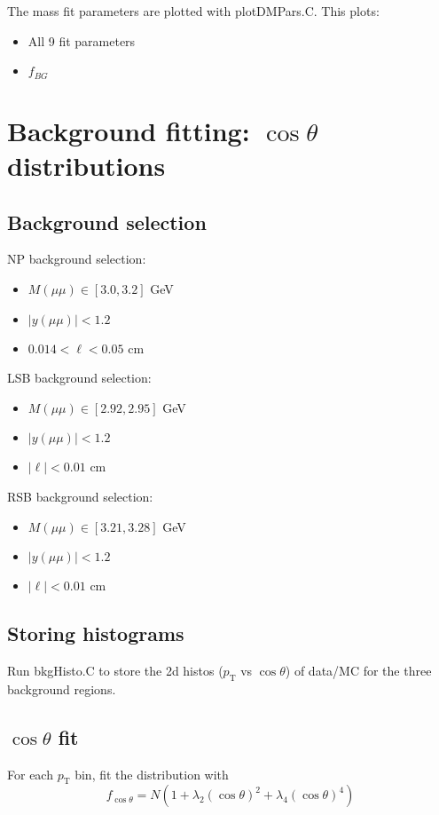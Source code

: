\documentclass{article}
\newcommand{\pt}{p_\text{T}}
\newcommand{\cost}{\cos\theta}
\begin{document}
The mass fit parameters are plotted with plotDMPars.C. This plots:
\begin{itemize}
\item All 9 fit parameters
\item $f_{BG}$
\end{itemize}

\pagebreak

\section{Background fitting: $\cost$ distributions}
\subsection{Background selection}

NP background selection:
\begin{itemize}
\item $M(\mu\mu)\in[3.0,3.2]$ GeV
\item $|y(\mu\mu)|<1.2$
\item $0.014 < \ell < 0.05$ cm
\end{itemize}

LSB background selection:
\begin{itemize}
\item $M(\mu\mu)\in[2.92,2.95]$ GeV
\item $|y(\mu\mu)|<1.2$
\item $|\ell| < 0.01$ cm
\end{itemize}

RSB background selection:
\begin{itemize}
\item $M(\mu\mu)\in[3.21,3.28]$ GeV
\item $|y(\mu\mu)|<1.2$
\item $|\ell| < 0.01$ cm
\end{itemize}

\subsection{Storing histograms}

Run bkgHisto.C to store the 2d histos ($\pt$ vs $\cost$) of data/MC for the three background regions.

\subsection{$\cost$ fit}

For each $\pt$ bin, fit the distribution with
\begin{equation}
f_{\cost} = N\left(1+\lambda_2(\cost)^2+\lambda_4(\cost)^4\right)
\end{equation}
\end{document}
